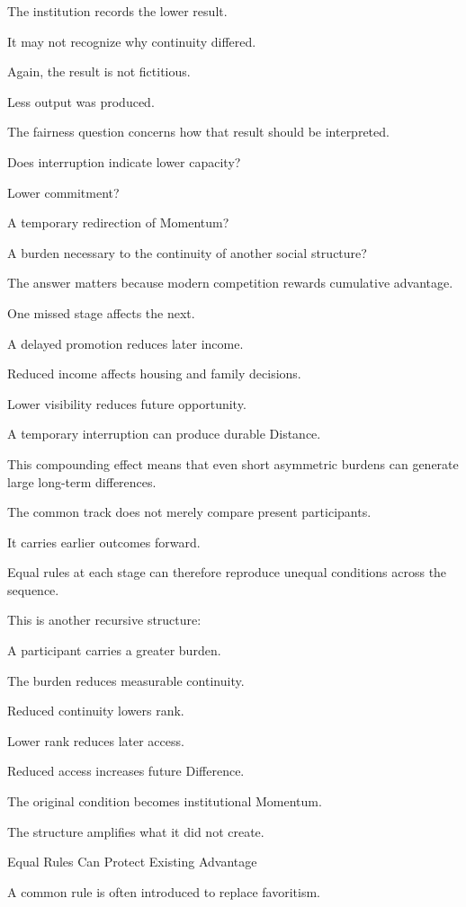 The institution records the lower result.

It may not recognize why continuity differed.

Again, the result is not fictitious.

Less output was produced.

The fairness question concerns how that result should be interpreted.

Does interruption indicate lower capacity?

Lower commitment?

A temporary redirection of Momentum?

A burden necessary to the continuity of another social structure?

The answer matters because modern competition rewards cumulative advantage.

One missed stage affects the next.

A delayed promotion reduces later income.

Reduced income affects housing and family decisions.

Lower visibility reduces future opportunity.

A temporary interruption can produce durable Distance.

This compounding effect means that even short asymmetric burdens can generate large long-term differences.

The common track does not merely compare present participants.

It carries earlier outcomes forward.

Equal rules at each stage can therefore reproduce unequal conditions across the sequence.

This is another recursive structure:

A participant carries a greater burden.

The burden reduces measurable continuity.

Reduced continuity lowers rank.

Lower rank reduces later access.

Reduced access increases future Difference.

The original condition becomes institutional Momentum.

The structure amplifies what it did not create.

Equal Rules Can Protect Existing Advantage

A common rule is often introduced to replace favoritism.


